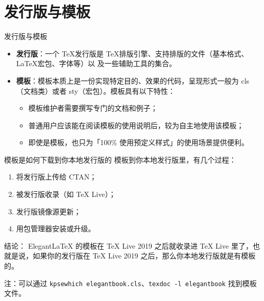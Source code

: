 
\section{发行版与模板}
\begin{frame}{发行版与模板}

  \begin{itemize}
    \item \textbf{发行版}：一个 \TeX 发行版是 \TeX 排版引擎、支持排版的文件（基本格式、\LaTeX 宏包、字体等）以
    及一些辅助工具的集合。\\[3ex]
    \item \textbf{模板}：模板本质上是一份实现特定目的、效果的代码，呈现形式一般为 cls（文档类）或者 sty（宏包）。模板具有以下特性：
    \begin{itemize}
      \item 模板维护者需要撰写专门的文档和例子；
      \item 普通用户应该能在阅读模板的使用说明后，较为自主地使用该模板；
      \item 即使是模板，也只为「100\% 使用预定义样式」的使用场景提供便利。
    \end{itemize}
  \end{itemize}
\end{frame}

\begin{frame}[fragile]{模板是如何下载到你本地发行版的}
  模板到你本地发行版里，有几个过程：
  \begin{enumerate}
    \item 将发行版上传给 CTAN；
    \item 被发行版收录（如 TeX Live）；
    \item 发行版镜像源更新；
    \item 用包管理器安装或升级。
  \end{enumerate}

  \textcolor{iron}{结论：} ElegantLaTeX 的模板在 TeX Live 2019 之后就收录进 TeX Live 里了，也就是说，如果你的发行版在 TeX Live 2019 之后，那么你本地发行版就是有模板的。

  注：可以通过 \lstinline{kpsewhich elegantbook.cls}、\lstinline{texdoc -l elegantbook} 找到模板文件。
\end{frame}

